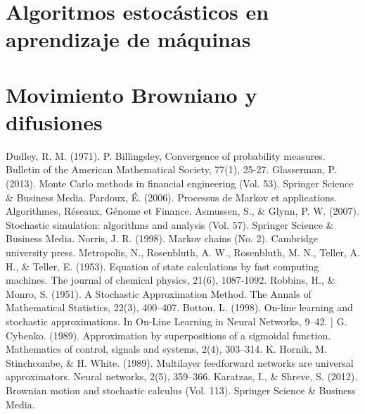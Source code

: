 \documentclass[letterpaper,11pt]{article} %
\theoremstyle{defbreak}
\theoremstyle{propbreak}
\theoremstyle{remark}
\theoremstyle{break}
\begin{document}
\section{Algoritmos estocásticos en aprendizaje de máquinas}


\newpage
\section{Movimiento Browniano y difusiones}
\label{browniano}


\newpage
\begin{references}
 Dudley, R. M. (1971). P. Billingsley, Convergence of probability measures. Bulletin of the American Mathematical Society, 77(1), 25-27.
 Glasserman, P. (2013). Monte Carlo methods in financial engineering (Vol. 53). Springer Science \& Business Media.
 Pardoux, É. (2006). Processus de Markov et applications. Algorithmes, Réseaux, Génome et Finance.
 Asmussen, S., \& Glynn, P. W. (2007). Stochastic simulation: algorithms and analysis (Vol. 57). Springer Science \& Business Media.
 Norris, J. R. (1998). Markov chains (No. 2). Cambridge university press.
 Metropolis, N., Rosenbluth, A. W., Rosenbluth, M. N., Teller, A. H., \& Teller, E. (1953). Equation of state calculations by fast computing machines. The journal of chemical physics, 21(6), 1087-1092.
 Robbins, H., \& Monro, S. (1951). A Stochastic Approximation Method. The Annals of Mathematical Statistics, 22(3), 400–407.
 Bottou, L. (1998). On-line learning and stochastic approximations. In On-Line Learning in Neural Networks, 9–42.
 ] G. Cybenko. (1989). Approximation by superpositions of a sigmoidal function. Mathematics of control, signals and systems, 2(4), 303–314.
 K. Hornik, M. Stinchcombe, \& H. White. (1989). Multilayer feedforward networks are universal approximators. Neural networks, 2(5), 359–366.
 Karatzas, I., \& Shreve, S. (2012). Brownian motion and stochastic calculus (Vol. 113). Springer Science & Business Media.
\end{references}
\end{document}
